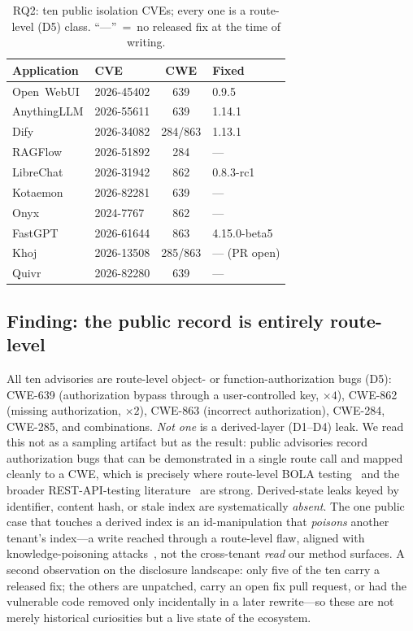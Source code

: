 \IfFileExists{IEEEtran.cls}{\documentclass[conference]{IEEEtran}}{\documentclass[10pt,twocolumn]{article}}
\begin{document}
\begin{table}[t]\centering\small
\caption{RQ2: ten public isolation CVEs; every one is a route-level (D5) class. ``---''~=~no released fix at the time of writing.}
\label{tab:incidents}
\begin{tabular}{llcl}
\toprule
Application & CVE & CWE & Fixed \\
\midrule
Open~WebUI & 2026-45402 & 639 & 0.9.5 \\
AnythingLLM & 2026-55611 & 639 & 1.14.1 \\
Dify & 2026-34082 & 284/863 & 1.13.1 \\
RAGFlow & 2026-51892 & 284 & --- \\
LibreChat & 2026-31942 & 862 & 0.8.3-rc1 \\
Kotaemon & 2026-82281 & 639 & --- \\
Onyx & 2024-7767 & 862 & --- \\
FastGPT & 2026-61644 & 863 & 4.15.0-beta5 \\
Khoj & 2026-13508 & 285/863 & --- (PR open) \\
Quivr & 2026-82280 & 639 & --- \\
\bottomrule
\end{tabular}
\end{table}

\subsection{Finding: the public record is entirely route-level}
All ten advisories are route-level object- or function-authorization bugs (D5):
CWE-639 (authorization bypass through a user-controlled key, $\times4$), CWE-862 (missing
authorization, $\times2$), CWE-863 (incorrect authorization), CWE-284, CWE-285, and combinations.
\emph{Not one} is a derived-layer (D1--D4) leak. We read this not as a sampling artifact but as the
result: public advisories record authorization bugs that can be demonstrated in a single route call
and mapped cleanly to a CWE, which is precisely where route-level BOLA
testing~\cite{arcuri2025fuzzbola,corradini2023massassign,santos2025bolapetri} and the broader
REST-API-testing literature~\cite{atlidakis2019restler,golmohammadi2023survey,zhang2023openproblems}
are strong. Derived-state leaks keyed by identifier, content hash, or stale index are systematically
\emph{absent}. The one public case that touches a derived index is an id-manipulation that
\emph{poisons} another tenant's index---a write reached through a route-level flaw, aligned with
knowledge-poisoning attacks~\cite{zou2025poisonedrag}, not the cross-tenant \emph{read} our method
surfaces. A second observation on the disclosure landscape: only five of the ten carry a released
fix; the others are unpatched, carry an open fix pull request, or had the vulnerable code removed
only incidentally in a later rewrite---so these are not merely historical curiosities but a live
state of the ecosystem.
\end{document}
